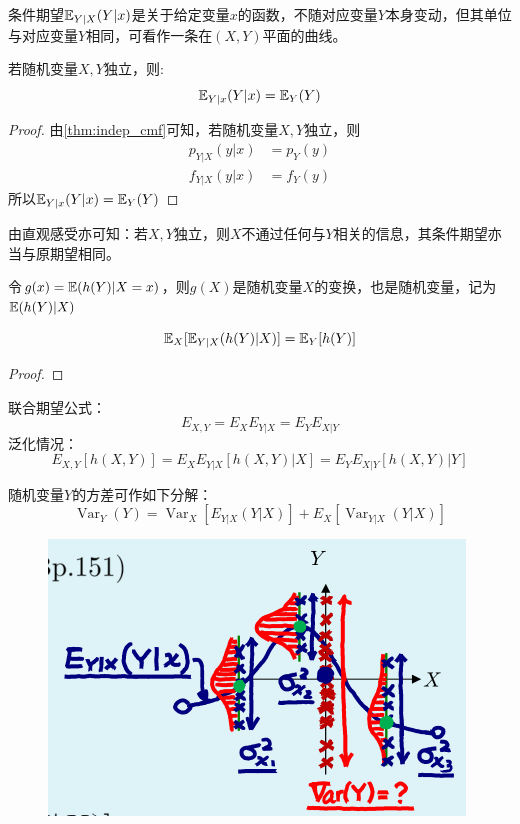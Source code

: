 \begin{remark}
    条件期望$\mathbb{E}_{Y|X}(Y|x)$是关于给定变量$x$的函数，不随对应变量$Y$本身变动，但其单位与对应变量$Y$相同，可看作一条在$(X,Y)$平面的曲线。
\end{remark}

\begin{theorem}
    若随机变量$X,Y$独立，则:
    \[ \mathbb{E}_{Y|x}(Y|x)=\mathbb{E}_{Y}(Y) \]
\end{theorem}

\begin{proof}
    由\ref{thm:indep_cmf}可知，若随机变量$X,Y$独立，则
    \begin{align*}
        p_{Y|X}(y|x)&=p_{Y}(y) \\
        f_{Y|X}(y|x)&=f_{Y}(y)
    \end{align*}
    所以$\mathbb{E}_{Y|x}(Y|x)=\mathbb{E}_{Y}(Y)$
\end{proof}

由直观感受亦可知：若$X,Y$独立，则$X$不通过任何与$Y$相关的信息，其条件期望亦当与原期望相同。

\begin{note}
    令$g(x)=\mathbb{E}(h(Y)|X=x)$，则$g(X)$是随机变量$X$的变换，也是随机变量，记为$\mathbb{E}(h(Y)|X)$
\end{note}

\begin{theorem}[重期望公式]
    \[ \mathbb{E}_X[\mathbb{E}_{Y|X}(h(Y)|X)] = \mathbb{E}_{Y}[h(Y)] \]
\end{theorem}

\begin{proof}
\end{proof}

\begin{theorem}
    联合期望公式：
    \[ E_{X,Y}=E_X E_{Y|X} = E_Y E_{X|Y} \]
    泛化情况：
    \[ E_{X,Y}[h(X,Y)]=E_X E_{Y|X}[h(X,Y)|X] = E_Y E_{X|Y}[h(X,Y)|Y] \]
\end{theorem}

\begin{theorem}[重方差公式]\label{thm:var_dec}
    随机变量$Y$的方差可作如下分解：
    \[ \operatorname{Var}_Y(Y)=\operatorname{Var}_X[E_{Y|X}(Y|X)] + E_X[\operatorname{Var}_{Y|X}(Y|X)] \]
\end{theorem}

\begin{figure}
    \centering
    \includegraphics{image/var_dec.png}
\end{figure}

